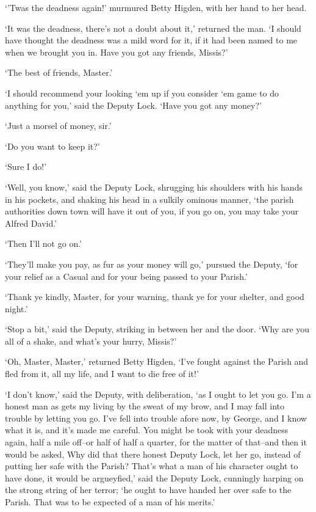 ‘’Twas the deadness again!’ murmured Betty Higden, with her hand to her
head.

‘It was the deadness, there’s not a doubt about it,’ returned the man.
‘I should have thought the deadness was a mild word for it, if it had
been named to me when we brought you in. Have you got any friends,
Missis?’

‘The best of friends, Master.’

‘I should recommend your looking ‘em up if you consider ‘em game to do
anything for you,’ said the Deputy Lock. ‘Have you got any money?’

‘Just a morsel of money, sir.’

‘Do you want to keep it?’

‘Sure I do!’

‘Well, you know,’ said the Deputy Lock, shrugging his shoulders with his
hands in his pockets, and shaking his head in a sulkily ominous manner,
‘the parish authorities down town will have it out of you, if you go on,
you may take your Alfred David.’

‘Then I’ll not go on.’

‘They’ll make you pay, as fur as your money will go,’ pursued the
Deputy, ‘for your relief as a Casual and for your being passed to your
Parish.’

‘Thank ye kindly, Master, for your warning, thank ye for your shelter,
and good night.’

‘Stop a bit,’ said the Deputy, striking in between her and the door.
‘Why are you all of a shake, and what’s your hurry, Missis?’

‘Oh, Master, Master,’ returned Betty Higden, ‘I’ve fought against the
Parish and fled from it, all my life, and I want to die free of it!’

‘I don’t know,’ said the Deputy, with deliberation, ‘as I ought to let
you go. I’m a honest man as gets my living by the sweat of my brow, and
I may fall into trouble by letting you go. I’ve fell into trouble afore
now, by George, and I know what it is, and it’s made me careful. You
might be took with your deadness again, half a mile off--or half of half
a quarter, for the matter of that--and then it would be asked, Why did
that there honest Deputy Lock, let her go, instead of putting her safe
with the Parish? That’s what a man of his character ought to have done,
it would be argueyfied,’ said the Deputy Lock, cunningly harping on the
strong string of her terror; ‘he ought to have handed her over safe to
the Parish. That was to be expected of a man of his merits.’

